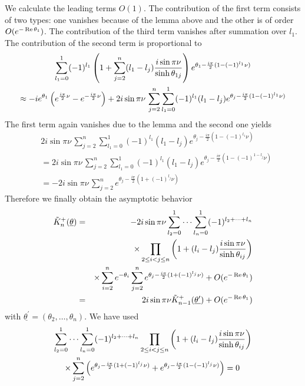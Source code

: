 \documentclass[a4paper,a4paper]{article}
\begin{document}
We calculate the leading terms $O(1).$ The contribution of the first term
consists of two types: one vanishes because of the lemma above and the other
is of order $O(e^{-\mathop{\rm Re}\theta _{1}})$. The contribution of the
third term vanishes after summation over $l_{1}.$ The contribution of the
second term is proportional to 
\begin{multline*}
\sum_{l_{1}=0}^{1}(-1)^{l_{1}}\left( 1+\sum_{j=2}^{n}(l_{1}-l_{j})\frac{%
i\sin \pi \nu }{\sinh \theta _{1j}}\right) e^{\theta _{1}-\frac{i\pi }{2}%
(1-(-1)^{l_{1}}\nu )} \\
\approx -ie^{\theta _{1}}\left( e^{\frac{i\pi }{2}\nu }-e^{-\frac{i\pi }{2}%
\nu }\right) +2i\sin \pi \nu
\,\sum_{j=2}^{n}\sum_{l_{1}=0}^{1}(-1)^{l_{1}}(l_{1}-l_{j})e^{\theta _{j}-%
\frac{i\pi }{2}(1-(-1)^{l_{1}}\nu )}
\end{multline*}
The first term again vanishes due to the lemma and the second one yields 
\begin{align*}
& 2i\sin \pi \nu
\,\sum_{j=2}^{n}\sum_{l_{1}=0}^{1}(-1)^{l_{1}}(l_{1}-l_{j})e^{\theta _{j}-%
\frac{i\pi }{2}(1-(-1)^{l_{1}}\nu )} \\
& =2i\sin \pi \nu
\,\sum_{j=2}^{n}\sum_{l_{1}=0}^{1}(-1)^{l_{1}}(l_{1}-l_{j})e^{\theta _{j}-%
\frac{i\pi }{2}(1-(-1)^{1-l_{j}}\nu )} \\
& =-2i\sin \pi \nu \,\sum_{j=2}^{n}e^{\theta _{j}-\frac{i\pi }{2}%
(1+(-1)^{l_{j}}\nu )}
\end{align*}
Therefore we finally obtain the asymptotic behavior 
\begin{eqnarray*}
\tilde{K}_{n}^{+}(\underline{\theta }) &=&-2i\sin \pi \nu
\sum_{l_{2}=0}^{1}\dots \sum_{l_{n}=0}^{1}(-1)^{l_{2}+\dots +l_{n}} \\
&&\times \prod_{2\leq i<j\leq n}\left( 1+(l_{i}-l_{j})\frac{i\sin \pi \nu }{%
\sinh \theta _{ij}}\right) \\
&&\times \sum_{i=2}^{n}e^{-\theta _{i}}\sum_{j=2}^{n}e^{\theta _{j}-\frac{%
i\pi }{2}(1+(-1)^{l_{j}}\nu )}+O(e^{-\mathop{\rm Re}\theta _{1}}) \\
&=&2i\sin \pi \nu \tilde{K}_{n-1}^{+}(\underline{\theta ^{\prime }})+O(e^{-%
\mathop{\rm Re}\theta _{1}})
\end{eqnarray*}
with $\underline{\theta ^{\prime }}=(\theta _{2},\dots ,\theta _{n})$. We
have used 
\begin{multline*}
\sum_{l_{2}=0}^{1}\dots \sum_{l_{n}=0}^{1}(-1)^{l_{2}+\dots
+l_{n}}\prod_{2\leq i<j\leq n}\left( 1+(l_{i}-l_{j})\frac{i\sin \pi \nu }{%
\sinh \theta _{ij}}\right) \\
\times \sum_{j=2}^{n}\left( e^{\theta _{j}-\frac{i\pi }{2}(1+(-1)^{l_{j}}\nu
)}+e^{\theta _{j}-\frac{i\pi }{2}(1-(-1)^{l_{j}}\nu )}\right) =0\,
\end{multline*}
\end{document}
